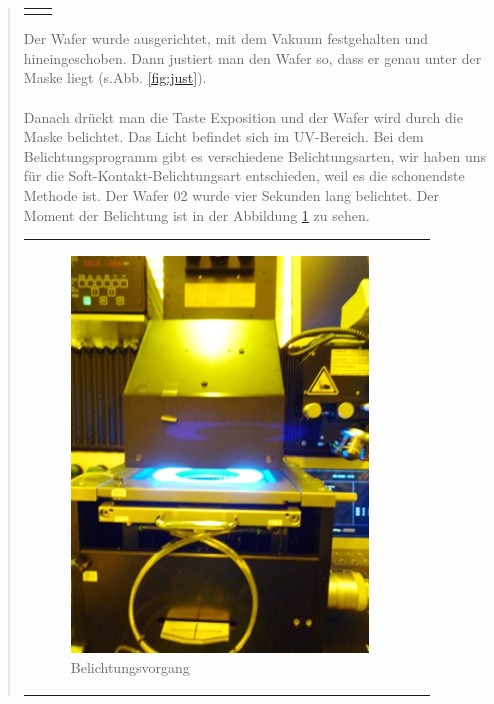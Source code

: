 \begin{quote}
\begin{center}
\begin{tabular}{ll}
\begin{minipage}{0.4\textwidth}
                    \end{minipage}

                \end{tabular}
			\end{center}

    		\vspace{2em}

    		Der Wafer wurde ausgerichtet, mit dem Vakuum festgehalten und
    		hineingeschoben. Dann justiert man den Wafer so, dass er genau unter
    		der Maske liegt (s.Abb. \ref{fig:just}).\\
			\\
			Danach drückt man die Taste Exposition und der Wafer wird durch die
			Maske belichtet. Das Licht befindet sich im UV-Bereich. Bei dem
			Belichtungsprogramm gibt es verschiedene Belichtungsarten, wir haben
			uns für die Soft-Kontakt-Belichtungsart entschieden, weil es die
			schonendste Methode ist. Der Wafer 02 wurde vier Sekunden lang
			belichtet. Der Moment der Belichtung ist in der Abbildung
			\ref{fig:belichtung} zu sehen.

    		\vspace{2em}

    		\begin{center}
                \begin{tabular}{ll}

                \hspace{-14em}
                    \begin{minipage}{0.8\textwidth}
                        \begin{figure}[H]
                        \hspace{6em}
                            \includegraphics[scale=1.0, trim = 0cm 0cm 0cm
                            0cm, clip]{./HerstellungBilder/Belichtungsvorgang.png}
                            \caption{Belichtungsvorgang}
                           \label{fig:belichtung}
                        \end{figure}


\end{minipage}
\end{tabular}
\end{center}
\end{quote}
